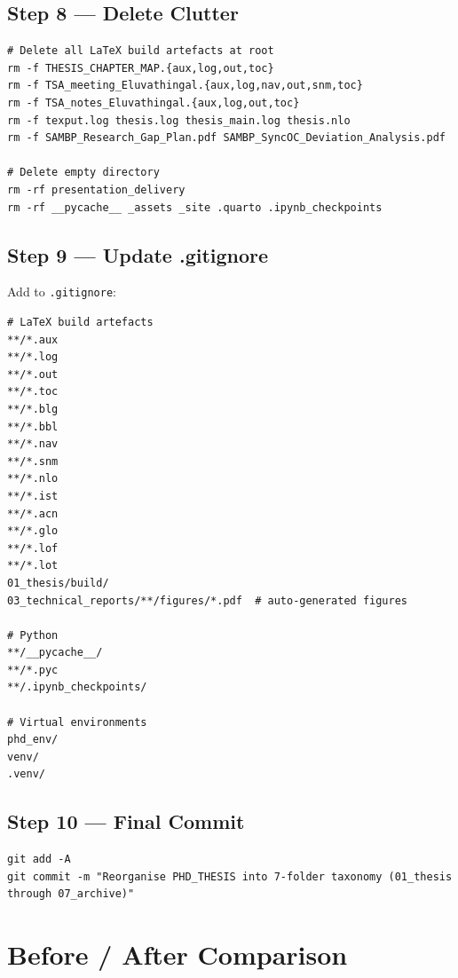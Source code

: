 \documentclass[11pt,a4paper]{article}
\begin{document}
\subsection{Step 8 — Delete Clutter}

\begin{verbatim}
# Delete all LaTeX build artefacts at root
rm -f THESIS_CHAPTER_MAP.{aux,log,out,toc}
rm -f TSA_meeting_Eluvathingal.{aux,log,nav,out,snm,toc}
rm -f TSA_notes_Eluvathingal.{aux,log,out,toc}
rm -f texput.log thesis.log thesis_main.log thesis.nlo
rm -f SAMBP_Research_Gap_Plan.pdf SAMBP_SyncOC_Deviation_Analysis.pdf

# Delete empty directory
rm -rf presentation_delivery
rm -rf __pycache__ _assets _site .quarto .ipynb_checkpoints
\end{verbatim}

\subsection{Step 9 — Update .gitignore}

Add to \texttt{.gitignore}:
\begin{verbatim}
# LaTeX build artefacts
**/*.aux
**/*.log
**/*.out
**/*.toc
**/*.blg
**/*.bbl
**/*.nav
**/*.snm
**/*.nlo
**/*.ist
**/*.acn
**/*.glo
**/*.lof
**/*.lot
01_thesis/build/
03_technical_reports/**/figures/*.pdf  # auto-generated figures

# Python
**/__pycache__/
**/*.pyc
**/.ipynb_checkpoints/

# Virtual environments
phd_env/
venv/
.venv/
\end{verbatim}

\subsection{Step 10 — Final Commit}

\begin{verbatim}
git add -A
git commit -m "Reorganise PHD_THESIS into 7-folder taxonomy (01_thesis through 07_archive)"
\end{verbatim}

\newpage
\section{Before / After Comparison}
\end{document}

